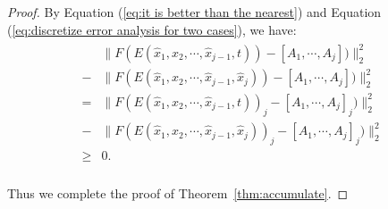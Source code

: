\begin{proof}
By Equation (\ref{eq:it is better than the nearest}) and Equation (\ref{eq:discretize error analysis for two cases}), we have:\\
\begin{align}
\label{eq:discretize error analysis difference}
\begin{aligned}
    &  \| F(E(\hat{x}_1,\hat{x}_2,\cdots,\hat{x}_{j-1},t))-[A_1,\cdots,A_j]) \|_2^2 \\
      -  &  \| F(E(\hat{x}_1,\hat{x}_2,\cdots,\hat{x}_{j-1},\hat{x}_j))-[A_1,\cdots,A_j]) \|_2^2 \\
    =&  \| F(E(\hat{x}_1,\hat{x}_2,\cdots,\hat{x}_{j-1},t))_j-[A_1,\cdots,A_j]_j) \|_2^2 \\
      -  &  \| F(E(\hat{x}_1,\hat{x}_2,\cdots,\hat{x}_{j-1},\hat{x}_j))_j-[A_1,\cdots,A_j]_j) \|_2^2 \\
    \ge& 0.\\
\end{aligned}
\end{align}




Thus we complete the proof of Theorem~\ref{thm:accumulate}.
\end{proof}
